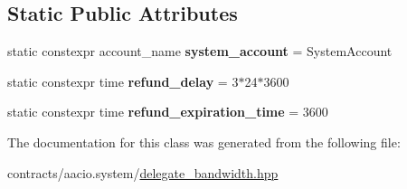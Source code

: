 \subsection*{Static Public Attributes}
\begin{DoxyCompactItemize}
\item 
\mbox{\label{classaaciosystem_1_1delegate__bandwidth_a975f93d13826fe8775231e5a33e5b62c}} 
static constexpr account\+\_\+name {\bfseries system\+\_\+account} = System\+Account
\item 
\mbox{\label{classaaciosystem_1_1delegate__bandwidth_a76fe68e5c49f2d69fa09e5c019b09e21}} 
static constexpr time {\bfseries refund\+\_\+delay} = 3$\ast$24$\ast$3600
\item 
\mbox{\label{classaaciosystem_1_1delegate__bandwidth_ae605a2e132ff37c29bff16a17956726f}} 
static constexpr time {\bfseries refund\+\_\+expiration\+\_\+time} = 3600
\end{DoxyCompactItemize}


The documentation for this class was generated from the following file\+:\begin{DoxyCompactItemize}
\item 
contracts/aacio.\+system/\mbox{\hyperlink{delegate__bandwidth_8hpp}{delegate\+\_\+bandwidth.\+hpp}}\end{DoxyCompactItemize}
